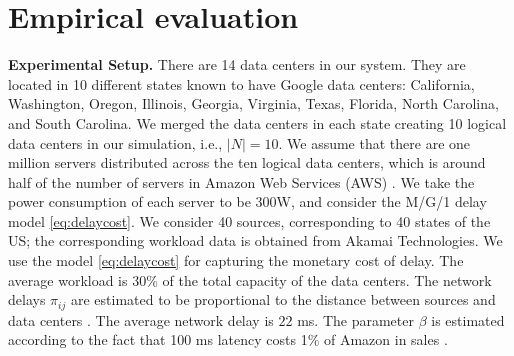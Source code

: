 \section{Empirical evaluation}
\label{sec:caseStudy}


\textbf{Experimental Setup.} There are 14 data centers in our
system. They are located in 10 different states known to have Google
data centers: California, Washington, Oregon, Illinois, Georgia,
Virginia, Texas, Florida, North Carolina, and South Carolina. We
merged the data centers in each state creating 10 logical data centers
in our simulation, i.e., $|N|=10$. We assume that there are one
million servers distributed across the ten logical data centers, which
is around half of the number of servers in Amazon Web Services (AWS)
{\cite{AWSServers}}. We take the power consumption of each server to
be 300W, and consider the M/G/1 delay model \eqref{eq:delaycost}.
We consider 40 sources, corresponding to 40 states of the US; the
corresponding workload data is obtained from Akamai Technologies. We
use the model \eqref{eq:delaycost} for capturing the monetary cost of
delay. The average workload is 30\% of the total capacity of the data
centers. The network delays $\pi_{ij}$ are estimated to be
proportional to the distance between sources and data centers
\cite{ATTNetworkLatency}. The average network delay is $22$ ms.
The parameter $\beta$ is estimated according to the fact that 100
ms latency costs 1\% of Amazon in sales \cite{liddle2008amazon}.



